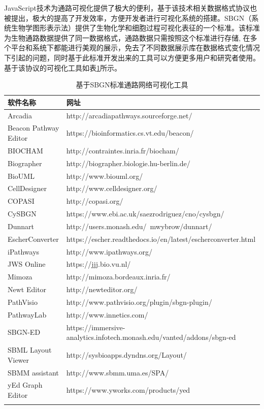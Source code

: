 JavaScript技术为通路可视化提供了极大的便利，基于该技术相关数据格式协议也被提出，极大的提高了开发效率，方便开发者进行可视化系统的搭建。SBGN\cite{le2009systems}（系统生物学图形表示法）提供了生物化学和细胞过程可视化表征的一个标准。该标准为生物通路数据提供了同一数据格式，通路数据只需按照这个标准进行存储, 在多个平台和系统下都能进行美观的展示，免去了不同数据展示库在数据格式变化情况下引起的问题，同时基于此标准开发出来的工具可以方便更多用户和研究者使用。基于该协议的可视化工具如表\ref{sbgn}所示。

\begin{table}[htbp]
  \centering
	\caption[table2]{基于SBGN标准通路网络可视化工具}
\vspace{0.5em}\wuhao
\begin{tabularx}{1.0\textwidth}{lX}
\toprule[1.5pt]
软件名称 & 网址 \\
\midrule[1pt]
Arcadia	 &  http://arcadiapathways.sourceforge.net/\\
Beacon Pathway Editor	 & https://bioinformatics.cs.vt.edu/beacon/\\
BIOCHAM	 & http://contraintes.inria.fr/biocham/\\
Biographer	 & http://biographer.biologie.hu-berlin.de/\\
BioUML	& http://www.biouml.org/\\
CellDesigner & http://www.celldesigner.org/\\
COPASI	& http://copasi.org/\\
CySBGN	 & https://www.ebi.ac.uk/saezrodriguez/cno/cysbgn/\\
Dunnart	 & http://users.monash.edu/~mwybrow/dunnart/\\
EscherConverter		& https://escher.readthedocs.io/en/latest/escherconverter.html\\
iPathways	 & http://www.ipathways.org/\\
JWS Online	& https://jjj.bio.vu.nl/\\
Mimoza	 & http://mimoza.bordeaux.inria.fr/\\
Newt Editor	& http://newteditor.org/\\
PathVisio	& http://www.pathvisio.org/plugin/sbgn-plugin/\\
PathwayLab	& http://www.innetics.com/\\
SBGN-ED	  & https://immersive-analytics.infotech.monash.edu/vanted/addons/sbgn-ed \\
SBML Layout Viewer	 & http://sysbioapps.dyndns.org/Layout/\\
SBMM assistant	 & http://www.sbmm.uma.es/SPA/\\
yEd Graph Editor	& https://www.yworks.com/products/yed\\

\bottomrule[1.5pt]
\label{sbgn}
\end{tabularx}
\end{table}

